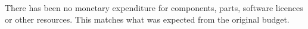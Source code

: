 




There has been no monetary expenditure for components, parts, software licences or other resources. This matches what was expected from the original budget. 